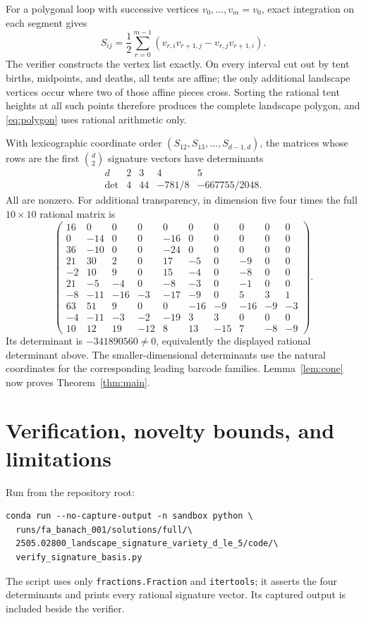 \documentclass[11pt]{article}
\begin{document}
For a polygonal loop with successive vertices $v_0,\ldots,v_m=v_0$, exact integration on each segment gives
\begin{equation}\label{eq:polygon}
 S_{ij}=\frac12\sum_{r=0}^{m-1}
 (v_{r,i}v_{r+1,j}-v_{r,j}v_{r+1,i}).
\end{equation}
The verifier constructs the vertex list exactly.  On every interval cut out by tent births, midpoints, and deaths, all tents are affine; the only additional landscape vertices occur where two of those affine pieces cross.  Sorting the rational tent heights at all such points therefore produces the complete landscape polygon, and \eqref{eq:polygon} uses rational arithmetic only.

With lexicographic coordinate order $(S_{12},S_{13},\ldots,S_{d-1,d})$, the matrices whose rows are the first $\binom d2$ signature vectors have determinants
\[
\begin{array}{c|cccc}
d&2&3&4&5\\ \hline
\det&4&44&-781/8&-667755/2048.
\end{array}
\]
All are nonzero.  For additional transparency, in dimension five four times the full $10\times10$ rational matrix is
{\scriptsize
\[
\begin{pmatrix}
16&0&0&0&0&0&0&0&0&0\\
0&-14&0&0&-16&0&0&0&0&0\\
36&-10&0&0&-24&0&0&0&0&0\\
21&30&2&0&17&-5&0&-9&0&0\\
-2&10&9&0&15&-4&0&-8&0&0\\
21&-5&-4&0&-8&-3&0&-1&0&0\\
-8&-11&-16&-3&-17&-9&0&5&3&1\\
63&51&9&0&0&-16&-9&-16&-9&-3\\
-4&-11&-3&-2&-19&3&3&0&0&0\\
10&12&19&-12&8&13&-15&7&-8&-9
\end{pmatrix}.
\]
}
Its determinant is $-341890560\neq0$, equivalently the displayed rational determinant above.  The smaller-dimensional determinants use the natural coordinates for the corresponding leading barcode families.  Lemma~\ref{lem:cone} now proves Theorem~\ref{thm:main}.

\section{Verification, novelty bounds, and limitations}

Run from the repository root:
\begin{verbatim}
conda run --no-capture-output -n sandbox python \
  runs/fa_banach_001/solutions/full/\
  2505.02800_landscape_signature_variety_d_le_5/code/\
  verify_signature_basis.py
\end{verbatim}
The script uses only \texttt{fractions.Fraction} and \texttt{itertools}; it asserts the four determinants and prints every rational signature vector.  Its captured output is included beside the verifier.
\end{document}
